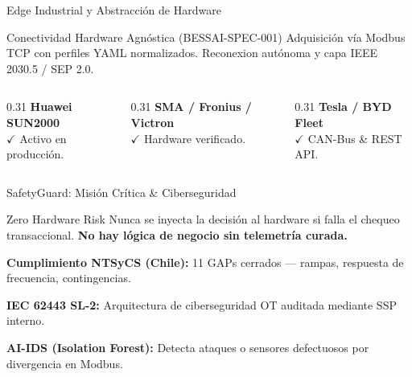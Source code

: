 \documentclass[10pt,aspectratio=169]{beamer}
\let\tempone\itemize
\let\temptwo\enditemize
\renewenvironment{itemize}{\tempone\addtolength{\itemsep}{0.3em}}{\temptwo}
\begin{document}
\begin{frame}{Edge Industrial y Abstracci\'on de Hardware}
  \begin{block}{Conectividad Hardware Agn\'ostica (BESSAI-SPEC-001)}
    Adquisici\'on v\'ia Modbus TCP con perfiles YAML normalizados. Reconexion aut\'onoma y capa IEEE 2030.5 / SEP 2.0.
  \end{block}
  \vspace{0.4cm}
  \begin{columns}[t]
    \begin{column}{0.31\textwidth}
      \textbf{\color{accentorange}Huawei SUN2000} \\
      $\checkmark$ Activo en producci\'on.
    \end{column}
    \begin{column}{0.31\textwidth}
      \textbf{\color{accentorange}SMA / Fronius / Victron} \\
      $\checkmark$ Hardware verificado.
    \end{column}
    \begin{column}{0.31\textwidth}
      \textbf{\color{accentorange}Tesla / BYD Fleet} \\
      $\checkmark$ CAN-Bus \& REST API.
    \end{column}
  \end{columns}
\end{frame}

\begin{frame}{SafetyGuard: Misi\'on Cr\'itica \& Ciberseguridad}
  \begin{block}{Zero Hardware Risk}
    Nunca se inyecta la decisi\'on al hardware si falla el chequeo transaccional. \textbf{No hay l\'ogica de negocio sin telemetr\'ia curada.}
  \end{block}
  \begin{itemize}
    \item \textbf{Cumplimiento NTSyCS (Chile):} 11 GAPs cerrados --- rampas, respuesta de frecuencia, contingencias.
    \item \textbf{IEC 62443 SL-2:} Arquitectura de ciberseguridad OT auditada mediante SSP interno.
    \item \textbf{AI-IDS (Isolation Forest):} Detecta ataques o sensores defectuosos por divergencia en Modbus.
  \end{itemize}
\end{frame}
\end{document}

